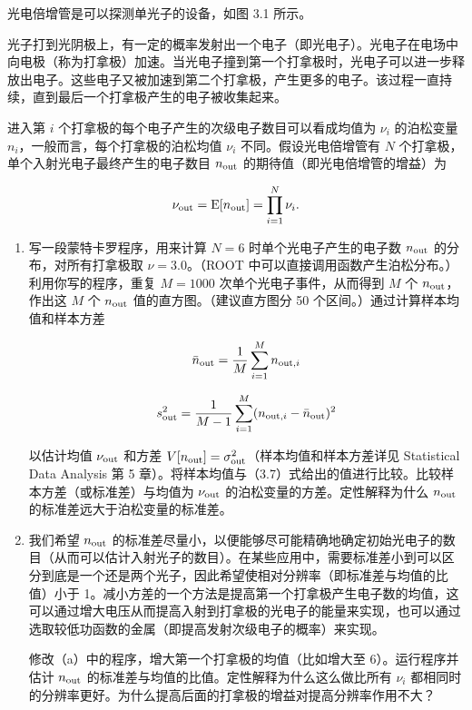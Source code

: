 \begin{question}
光电倍增管是可以探测单光子的设备，如图 3.1 所示。


光子打到光阴极上，有一定的概率发射出一个电子（即光电子）。光电子在电场中向电极（称为打拿极）加速。当光电子撞到第一个打拿极时，光电子可以进一步释放出电子。这些电子又被加速到第二个打拿极，产生更多的电子。该过程一直持续，直到最后一个打拿极产生的电子被收集起来。

进入第 \(i\) 个打拿极的每个电子产生的次级电子数目可以看成均值为
\(\nu_i\) 的泊松变量 \(n_i\)，一般而言，每个打拿极的泊松均值 \(\nu_i\)
不同。假设光电倍增管有 \(N\) 个打拿极，单个入射光电子最终产生的电子数目
\(n_{\rm out}\) 的期待值（即光电倍增管的增益）为

\[
\nu_{\rm out}=\operatorname{E}[n_{\rm out}]=\prod_{i=1}^{N}\nu_i.
\]

\begin{enumerate}
\item 写一段蒙特卡罗程序，用来计算 \(N=6\) 时单个光电子产生的电子数
\(n_{\rm out}\) 的分布，对所有打拿极取 \(\nu=3.0\)。（ROOT
中可以直接调用函数产生泊松分布。）利用你写的程序，重复 \(M=1000\)
次单个光电子事件，从而得到 \(M\) 个 \(n_{\rm out}\)，作出这 \(M\) 个
\(n_{\rm out}\) 值的直方图。（建议直方图分 50
个区间。）通过计算样本均值和样本方差

\[
\bar n_{\rm out}=\frac{1}{M}\sum_{i=1}^{M}n_{{\rm out},i}
\]

\[
s_{\rm out}^2=\frac{1}{M-1}\sum_{i=1}^{M}(n_{{\rm out},i}-\bar n_{\rm out})^2
\]

以估计均值 \(\nu_{\rm out}\) 和方差
\(V[n_{\rm out}]=\sigma_{\rm out}^2\)（样本均值和样本方差详见
Statistical Data Analysis 第 5
章）。将样本均值与（3.7）式给出的值进行比较。比较样本方差（或标准差）与均值为
\(\nu_{\rm out}\) 的泊松变量的方差。定性解释为什么 \(n_{\rm out}\)
的标准差远大于泊松变量的标准差。

\item 我们希望 \(n_{\rm out}\)
的标准差尽量小，以便能够尽可能精确地确定初始光电子的数目（从而可以估计入射光子的数目）。在某些应用中，需要标准差小到可以区分到底是一个还是两个光子，因此希望使相对分辨率（即标准差与均值的比值）小于
1。减小方差的一个方法是提高第一个打拿极产生电子数的均值，这可以通过增大电压从而提高入射到打拿极的光电子的能量来实现，也可以通过选取较低功函数的金属（即提高发射次级电子的概率）来实现。

修改（a）中的程序，增大第一个打拿极的均值（比如增大至
6）。运行程序并估计 \(n_{\rm out}\)
的标准差与均值的比值。定性解释为什么这么做比所有 \(\nu_i\)
都相同时的分辨率更好。为什么提高后面的打拿极的增益对提高分辨率作用不大？


\end{enumerate}
\end{question}
